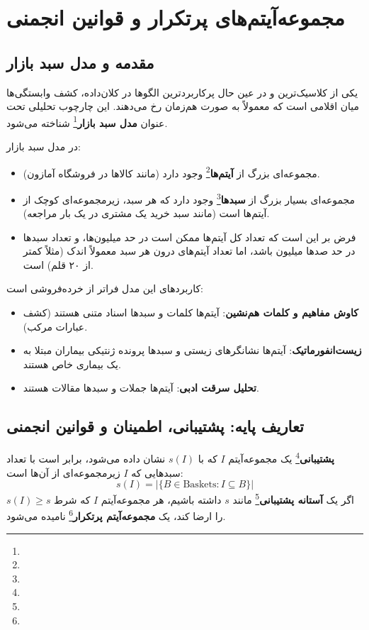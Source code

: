 \chapter{مجموعه‌آیتم‌های پرتکرار و قوانین انجمنی}
\label{ch:frequent-itemsets}

\section{مقدمه و مدل سبد بازار \texorpdfstring{}{(Market-Basket Model)}}
یکی از کلاسیک‌ترین و در عین حال پرکاربردترین الگوها در کلان‌داده، کشف وابستگی‌ها میان اقلامی است که معمولاً به صورت هم‌زمان رخ می‌دهند. این چارچوب تحلیلی تحت عنوان \textbf{مدل سبد بازار}\footnote{} شناخته می‌شود.

در مدل سبد بازار:
\begin{itemize}
    \item مجموعه‌ای بزرگ از \textbf{آیتم‌ها}\footnote{} وجود دارد (مانند کالاها در فروشگاه آمازون).
    \item مجموعه‌ای بسیار بزرگ از \textbf{سبدها}\footnote{} وجود دارد که هر سبد، زیرمجموعه‌ای کوچک از آیتم‌ها است (مانند سبد خرید یک مشتری در یک بار مراجعه).
    \item فرض بر این است که تعداد کل آیتم‌ها ممکن است در حد میلیون‌ها، و تعداد سبدها در حد صدها میلیون باشد، اما تعداد آیتم‌های درون هر سبد معمولاً اندک (مثلاً کمتر از ۲۰ قلم) است.
\end{itemize}

کاربردهای این مدل فراتر از خرده‌فروشی است:
\begin{itemize}
    \item \textbf{کاوش مفاهیم و کلمات هم‌نشین}: آیتم‌ها کلمات و سبدها اسناد متنی هستند (کشف عبارات مرکب).
    \item \textbf{زیست‌انفورماتیک}: آیتم‌ها نشانگرهای زیستی و سبدها پرونده ژنتیکی بیماران مبتلا به یک بیماری خاص هستند.
    \item \textbf{تحلیل سرقت ادبی}: آیتم‌ها جملات و سبدها مقالات هستند.
\end{itemize}

\section{تعاریف پایه: پشتیبانی، اطمینان و قوانین انجمنی}

\begin{definition}
\textbf{پشتیبانی}\footnote{} یک مجموعه‌آیتم $I$ که با $s(I)$ نشان داده می‌شود، برابر است با تعداد سبدهایی که $I$ زیرمجموعه‌ای از آن‌ها است:
\begin{equation}
s(I) = \Big| \{ B \in \text{Baskets} : I \subseteq B \} \Big|
\end{equation}
اگر یک \textbf{آستانه پشتیبانی}\footnote{} مانند $s$ داشته باشیم، هر مجموعه‌آیتم $I$ که شرط $s(I) \ge s$ را ارضا کند، یک \textbf{مجموعه‌آیتم پرتکرار}\footnote{} نامیده می‌شود.
\end{definition}

